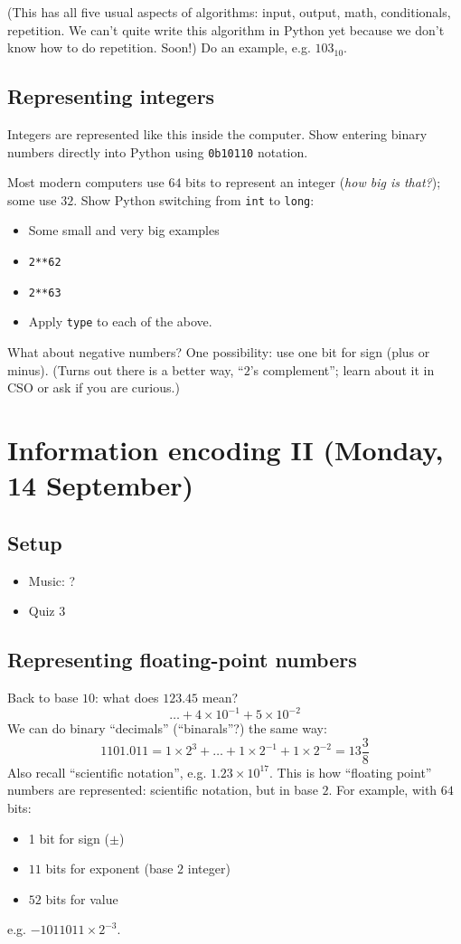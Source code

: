 \documentclass{article}
\begin{document}
(This has all five usual aspects of algorithms: input, output, math,
conditionals, repetition.  We can't quite write this algorithm in
Python yet because we don't know how to do repetition.  Soon!)  Do an
example, e.g. $103_{10}$.

\subsection*{Representing integers}

Integers are represented like this inside the computer.  Show entering
binary numbers directly into Python using \verb|0b10110| notation.

Most modern computers use $64$ bits to represent an integer (\emph{how
  big is that?}); some use $32$. Show Python switching from \verb|int|
to \verb|long|:
\begin{itemize}
\item Some small and very big examples
\item \verb|2**62|
\item \verb|2**63|
\item Apply \verb|type| to each of the above.
\end{itemize}

What about negative numbers?  One possibility: use one bit for sign
(plus or minus).  (Turns out there is a better way, ``$2$'s
complement''; learn about it in CSO or ask if you are curious.)

\newpage
\section{Information encoding II (Monday, 14 September)}

\subsection*{Setup}
\begin{itemize}
\item Music: ?
\item Quiz 3
\end{itemize}

\subsection*{Representing floating-point numbers}

Back to base $10$: what does $123.45$ mean?
\[ \dots + 4 \times 10^{-1} + 5 \times 10^{-2} \]
We can do binary ``decimals'' (``binarals''?) the same way: \[
1101.011 = 1 \times 2^3 + \dots + 1 \times 2^{-1} + 1 \times 2^{-2} =
13 \frac{3}{8} \]  Also recall ``scientific notation'', e.g. $1.23
\times 10^{17}$.  This is how ``floating point'' numbers are
represented: scientific notation, but in base $2$.  For example, with
$64$ bits:
\begin{itemize}
\item 1 bit for sign ($\pm$)
\item $11$ bits for exponent (base $2$ integer)
\item $52$ bits for value
\end{itemize}
e.g. $-1011011 \times 2^{-3}$.
\end{document}

